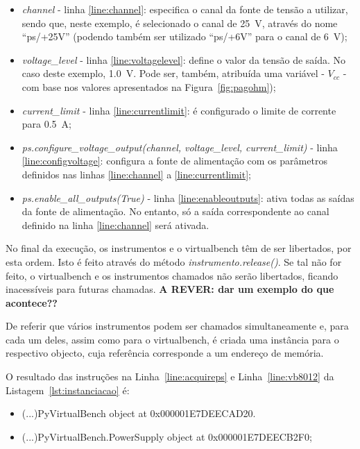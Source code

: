 \begin{itemize}
	\item \textit{channel} - linha \ref{line:channel}: especifica o canal da fonte de tensão a utilizar, sendo que, neste exemplo, é selecionado o canal de \SI{25}{\volt}, através do nome ``ps/+25V'' (podendo também ser utilizado ``ps/+6V'' para o canal de \SI{6}{\volt});
	\item \textit{voltage\_level} - linha \ref{line:voltagelevel}: define o valor da tensão de saída. No caso deste exemplo, \SI{1.0}{\volt}. Pode ser, também, atribuída uma variável - $V_{cc}$ - com base nos valores apresentados na Figura~\ref{fig:pagohm});
	\item  \textit{current\_limit} - linha \ref{line:currentlimit}: é configurado o limite de corrente para \SI{0.5}{\ampere};
	\item \textit{ps.configure\_voltage\_output(channel, voltage\_level, current\_limit)} - linha \ref{line:configvoltage}: configura a fonte de alimentação com os parâmetros definidos nas linhas \ref{line:channel} a \ref{line:currentlimit};
	\item \textit{ps.enable\_all\_outputs(True)} - linha \ref{line:enableoutputs}: ativa todas as saídas da fonte de alimentação. No entanto, só a saída correspondente ao canal definido na linha \ref{line:channel} será ativada.
\end{itemize}

No final da execução, os instrumentos e o \acrshort{virtualbench} têm de ser libertados, por esta ordem. Isto é feito através do método \textit{instrumento.release()}. Se tal não for feito, o \acrshort{virtualbench} e os instrumentos chamados não serão libertados, ficando inacessíveis para futuras chamadas. \textbf{A REVER: dar um exemplo do que acontece??}

De referir que vários instrumentos podem ser chamados simultaneamente e, para cada um deles, assim como para o \acrshort{virtualbench}, é criada uma instância para o respectivo objecto, cuja referência corresponde a um endereço de memória. 

O resultado das instruções na Linha~\ref{line:acquireps} e Linha~\ref{line:vb8012} da Listagem~\ref{lst:instanciacao} é:
\begin{itemize}
	\item (...)PyVirtualBench object at 0x000001E7DEECAD20.
	\item (...)PyVirtualBench.PowerSupply object at 0x000001E7DEECB2F0;
\end{itemize}

